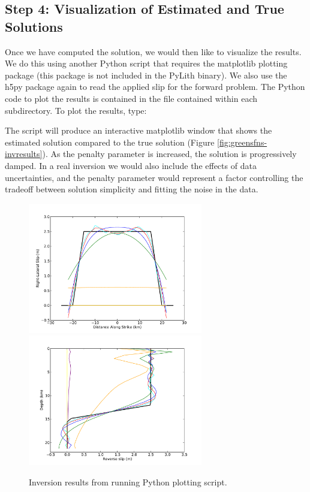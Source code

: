 \subsection{Step 4: Visualization of Estimated and True Solutions}

Once we have computed the solution, we would then like to visualize
the results. We do this using another Python script that requires
the matplotlib plotting package (this package is not included in the
PyLith binary). We also use the h5py package again to read the applied
slip for the forward problem. The Python code to plot the results
is contained in the  file contained within
each subdirectory. To plot the results, type:
The script will produce an interactive matplotlib window that shows
the estimated solution compared to the true solution (Figure
\vref{fig:greensfns-invresults}).  As the penalty parameter is
increased, the solution is progressively damped. In a real inversion
we would also include the effects of data uncertainties, and the
penalty parameter would represent a factor controlling the tradeoff
between solution simplicity and fitting the noise in the data.

\begin{figure}
  \includegraphics[width=3in]{examples/figs/greensfns2d_strikeslip_inversion}
  \includegraphics[width=3in]{examples/figs/greensfns2d_reverse_inversion}
  \caption{Inversion results from running Python plotting script.}
  \label{fig:greensfns-invresults}
\end{figure}


